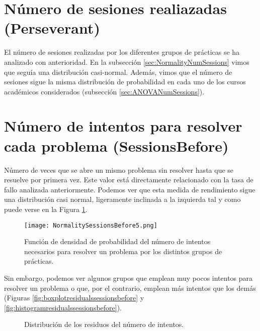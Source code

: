 \section{Número de sesiones realiazadas (Perseverant)}

El número de sesiones realizadas por los diferentes grupos de prácticas se ha analizado con anterioridad. En la subsección \ref{sec:NormalityNumSessions} vimos que seguía una distribución casi-normal. Además, vimos que el número de sesiones sigue la misma distribución de probabilidad en cada uno de los cursos académicos considerados (subsección \ref{sec:ANOVANumSessions}).

\section{Número de intentos para resolver cada problema (SessionsBefore)}

Número de veces que se abre un mismo problema sin resolver hasta que se resuelve por primera vez. Este valor está directamente relacionado con la tasa de fallo analizada anteriormente. Podemos ver que esta medida de rendimiento sigue una distribución casi normal, ligeramente inclinada a la izquierda tal y como puede verse en la Figura \ref{fig:densityplotsessionsbefore}.

\begin{figure}[H]
    \centering
    \texttt{[image: NormalitySessionsBefore5.png]}
    \caption{Función de densidad de probabilidad del número de intentos necesarios para resolver un problema por los distintos grupos de prácticas.}
    \label{fig:densityplotsessionsbefore}
\end{figure}

Sin embargo, podemos ver algunos grupos que emplean muy pocos intentos para resolver un problema o que, por el contrario, emplean más intentos que los demás (Figuras \ref{fig:boxplotresidualssessionsbefore} y \ref{fig:histogramresidualssessionsbefore}).

\begin{figure}[H]
\centering
{}\qquad
{}
\caption{Distribución de los residuos del número de intentos.}
\label{fig:sessionsbefore}
\end{figure}

